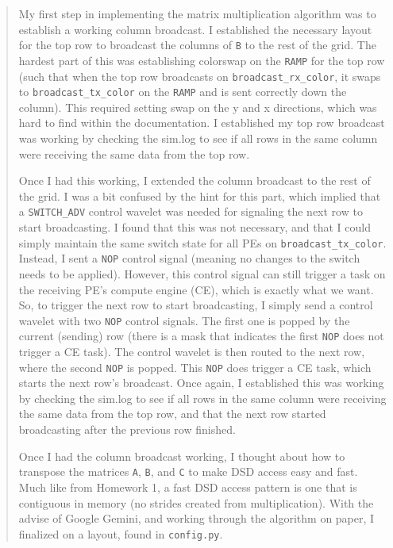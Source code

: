\documentclass[sigconf]{acmart}
\begin{document}
\begin{abstract}

My first step in implementing the matrix multiplication algorithm was to establish
a working column broadcast. I established the necessary layout for the top row to
broadcast the columns of \texttt{B} to the rest of the grid. The hardest part of this was
establishing colorswap on the \texttt{RAMP} for the top row (such that when the top row
broadcasts on \texttt{broadcast\_rx\_color}, it swaps to \texttt{broadcast\_tx\_color} on the \texttt{RAMP} and
is sent correctly down the column). This required setting swap on the y and x
directions, which was hard to find within the documentation. I established my top
row broadcast was working by checking the sim.log to see if all rows in the same
column were receiving the same data from the top row.

Once I had this working, I extended the column broadcast to the rest of the grid.
I was a bit confused by the hint for this part, which implied that a \texttt{SWITCH\_ADV}
control wavelet was needed for signaling the next row to start broadcasting. I 
found that this was not necessary, and that I could simply maintain the same
switch state for all PEs on \texttt{broadcast\_tx\_color}. Instead, I sent a \texttt{NOP} control signal
(meaning no changes to the switch needs to be applied). However, this control signal
can still trigger a task on the receiving PE's compute engine (CE), which is 
exactly what we want. So, to trigger the next row to start broadcasting, I simply
send a control wavelet with two \texttt{NOP} control signals. The first one is popped by 
the current (sending) row (there is a mask that indicates the first \texttt{NOP} does not trigger a
CE task). The control wavelet is then routed to the next row, where the second
\texttt{NOP} is popped. This \texttt{NOP} does trigger a CE task, which starts the next row's
broadcast. Once again, I established this was working by checking the sim.log to
see if all rows in the same column were receiving the same data from the top row,
and that the next row started broadcasting after the previous row finished.

Once I had the column broadcast working, I thought about how to transpose the matrices
\texttt{A}, \texttt{B}, and \texttt{C} to make DSD access easy and fast. Much like
from Homework 1, a fast DSD access pattern is one that is contiguous in memory
(no strides created from multiplication). With the advise of Google Gemini, and
working through the algorithm on paper, I finalized on a layout, found in
\texttt{config.py}.


\end{abstract}
\end{document}
